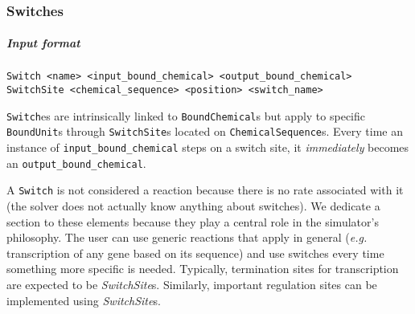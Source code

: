 
\subsubsection{Switches}

\subparagraph{Input format}
\begin{verbatim}
Switch <name> <input_bound_chemical> <output_bound_chemical>
SwitchSite <chemical_sequence> <position> <switch_name>
\end{verbatim}

\texttt{Switch}es are intrinsically linked to \texttt{BoundChemical}s but apply to specific \texttt{BoundUnit}s through \texttt{SwitchSite}s located on \texttt{ChemicalSequence}s. Every time an instance of \texttt{input\_bound\_chemical} steps on a switch site, it \emph{immediately} becomes an \texttt{output\_bound\_chemical}.

A \texttt{Switch} is not considered a reaction because there is no rate associated with it (the solver does not actually know anything about switches). We dedicate a section to these elements because they play a central role in the simulator's philosophy. The user can use generic reactions that apply in general (\textit{e.g.} transcription of any gene based on its sequence) and use switches every time something more specific is needed. Typically, termination sites for transcription are expected to be \textit{SwitchSite}s. Similarly, important regulation sites can be implemented using \textit{SwitchSite}s.

